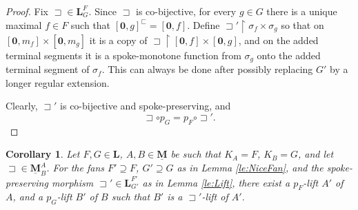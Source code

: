 \documentclass[12pt]{amsart}
\numberwithin{equation}{section}
\theoremstyle{plain}
\newtheorem{corollary}[theorem]{\bf Corollary}
\theoremstyle{definition}
\newcommand{\sqni}{\mathrel{\vphantom{\sqsupset}\text{\mathsurround=0pt\ooalign{$\sqsupset$\cr$-$\cr}}}}
\newcommand \sqsp{\sqsupset}
\newcommand \sqsb{\sqsubset}
\newcommand \rt{\mathbf{0}}
\newcommand \uhr{\upharpoonright}
\newcommand \LLb{\mathbf{L}}
\newcommand \MMub{\underline{\mathbf{M}}}
\begin{document}
\begin{proof}
Fix  $\sqsp \in \LLb^F_G$. %
Since $\sqsp$ is co-bijective, for every $g \in G$ there is a unique maximal $f \in F$ such that $[\rt,g]^\sqsb=[\rt,f]$. Define $\sqsp' \uhr \sigma_f \times \sigma_g$ so that on $[\rt,m_f] \times [\rt,m_g]$ it is a copy of $\sqsp \uhr [\rt,f] \times [\rt,g]$, and on the added terminal segments it is a spoke-monotone function from $\sigma_g$ onto the added terminal segment of $\sigma_f$. This can always be done after possibly replacing $G'$ by a longer regular extension.

Clearly, $\sqsp'$ is co-bijective and spoke-preserving, and $$\sqsp \circ p_G=p_F \circ \sqsp'.$$ %
	
	
\end{proof}

\begin{corollary}
	\label{co:PreserveSpokes}
	Let $F,G \in \LLb$, $A,B \in \MMub$ be such that $K_{A}=F$, $K_{B}=G$, and let $\sqsp \in \MMub^A_B$. For the fans $F' \supseteq F$, $G' \supseteq G$ as in Lemma \ref{le:NiceFan}, and the spoke-preserving morphism $\sqsp' \in \LLb^{F'}_{G'}$ as in Lemma \ref{le:Lift}, there exist a $p_F$-lift $A'$ of $A$, and a $p_G$-lift $B'$ of $B$ such that $B'$ is a $\sqsp'$-lift of $A'$.
\end{corollary}
\end{document}
